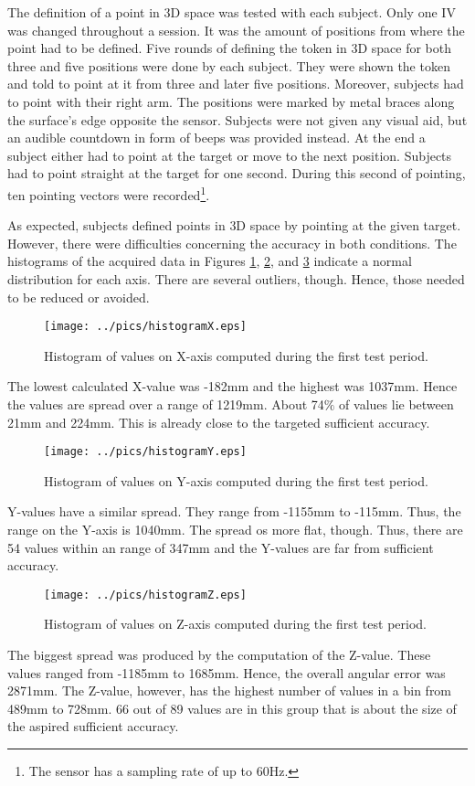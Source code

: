 The definition of a point in \ac{3D} space was tested with each subject. Only one \ac{IV} was changed throughout a session. It was the amount of positions from where the point had to be defined. Five rounds of defining the token in \ac{3D} space for both three and five positions were done by each subject. They were shown the token and told to point at it from three and later five positions. Moreover, subjects had to point with their right arm. The positions were marked by metal braces along the surface's edge opposite the sensor. Subjects were not given any visual aid, but an audible countdown in form of beeps was provided instead. At the end a subject either had to point at the target or move to the next position. Subjects had to point straight at the target for one second. During this second of pointing, ten pointing vectors were recorded\footnote{The sensor has a sampling rate of up to 60Hz.}.  

As expected, subjects defined points in \ac{3D} space by pointing at the given target. However, there were difficulties concerning the accuracy in both conditions. The histograms of the acquired data in Figures \ref{fig:testing_1_histoX}, \ref{fig:testing_1_histoY}, and \ref{fig:testing_1_histoZ} indicate a normal distribution for each axis. There are several outliers, though. Hence, those needed to be reduced or avoided.
\begin{figure}[H]%
\texttt{[image: ../pics/histogramX.eps]}%
\caption{Histogram of values on X-axis computed during the first test period.}%
\label{fig:testing_1_histoX}%
\end{figure}
The lowest calculated X-value was -182mm and the highest was 1037mm. Hence the values are spread over a range of 1219mm. About 74$\%$ of values lie between 21mm and 224mm. This is already close to the targeted sufficient accuracy.
\begin{figure}[H]%
\texttt{[image: ../pics/histogramY.eps]}%
\caption{Histogram of values on Y-axis computed during the first test period.}%
\label{fig:testing_1_histoY}%
\end{figure}
Y-values have a similar spread. They range from -1155mm to -115mm. Thus, the range on the Y-axis is 1040mm. The spread os more flat, though. Thus, there are 54 values within an range of 347mm and the Y-values are far from sufficient accuracy.
\begin{figure}[H]%
\texttt{[image: ../pics/histogramZ.eps]}%
\caption{Histogram of values on Z-axis computed during the first test period.}%
\label{fig:testing_1_histoZ}%
\end{figure}
The biggest spread was produced by the computation of the Z-value. These values ranged from -1185mm to 1685mm. Hence, the overall angular error was 2871mm. The Z-value, however, has the highest number of values in a bin from 489mm to 728mm. 66 out of 89 values are in this group that is about the size of the aspired sufficient accuracy.

